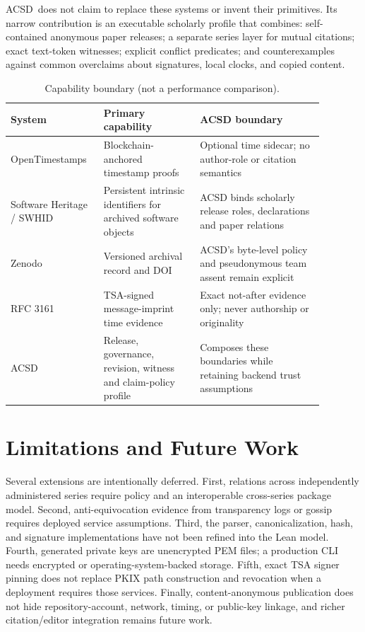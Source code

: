 \documentclass[11pt]{article}
\newcommand{\acsd}{\textsc{ACSD}}
\begin{document}
\acsd\ does not claim to replace these systems or invent their primitives. Its narrow contribution is an executable scholarly profile that combines: self-contained anonymous paper releases; a separate series layer for mutual citations; exact text-token witnesses; explicit conflict predicates; and counterexamples against common overclaims about signatures, local clocks, and copied content.

\begin{table}[t]
\centering
\caption{Capability boundary (not a performance comparison).}
\begin{tabular}{p{0.23\linewidth}p{0.29\linewidth}p{0.36\linewidth}}
\toprule
System & Primary capability & ACSD boundary \\
\midrule
OpenTimestamps & Blockchain-anchored timestamp proofs & Optional time sidecar; no author-role or citation semantics \\
Software Heritage / SWHID & Persistent intrinsic identifiers for archived software objects & ACSD binds scholarly release roles, declarations and paper relations \\
Zenodo & Versioned archival record and DOI & ACSD's byte-level policy and pseudonymous team assent remain explicit \\
RFC 3161 & TSA-signed message-imprint time evidence & Exact not-after evidence only; never authorship or originality \\
ACSD & Release, governance, revision, witness and claim-policy profile & Composes these boundaries while retaining backend trust assumptions \\
\bottomrule
\end{tabular}
\end{table}

\section{Limitations and Future Work}

Several extensions are intentionally deferred. First, relations across independently administered series require policy and an interoperable cross-series package model. Second, anti-equivocation evidence from transparency logs or gossip requires deployed service assumptions. Third, the parser, canonicalization, hash, and signature implementations have not been refined into the Lean model. Fourth, generated private keys are unencrypted PEM files; a production CLI needs encrypted or operating-system-backed storage. Fifth, exact TSA signer pinning does not replace PKIX path construction and revocation when a deployment requires those services. Finally, content-anonymous publication does not hide repository-account, network, timing, or public-key linkage, and richer citation/editor integration remains future work.
\end{document}
